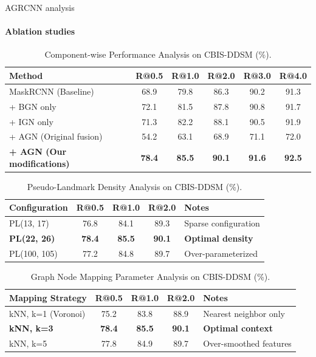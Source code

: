 \documentclass[8pt,aspectratio=169,xcolor=dvipsnames]{beamer}
\begin{document}
\begin{frame}{AGRCNN analysis}
\framesubtitle{Ablation studies}

\begin{table}[t]
   \caption{Component-wise Performance Analysis on CBIS-DDSM (\%).}
   \centering
   \footnotesize
   \renewcommand{\arraystretch}{1.1}
   \begin{tabular}{l|ccccc}
   	\hline
   	\textbf{Method} & \textbf{R@0.5} & \textbf{R@1.0} & \textbf{R@2.0} & \textbf{R@3.0} & \textbf{R@4.0} \\
   	\hline
   	MaskRCNN (Baseline) & 68.9 & 79.8 & 86.3 & 90.2 & 91.3\\
   	+ BGN only & 72.1 & 81.5 & 87.8 & 90.8 & 91.7\\
   	+ IGN only & 71.3 & 82.2 & 88.1 & 90.5 & 91.9\\
   	+ AGN (Original fusion) & 54.2 & 63.1 & 68.9 & 71.1 & 72.0\\
   	\hline
   	\textbf{+ AGN (Our modifications)} & \textbf{78.4} & \textbf{85.5} & \textbf{90.1} & \textbf{91.6} & \textbf{92.5}\\
   	\hline
   \end{tabular}
\end{table}

\begin{table}[t]
   \caption{Pseudo-Landmark Density Analysis on CBIS-DDSM (\%).}
   \centering
   \footnotesize
   \renewcommand{\arraystretch}{1.1}
   \begin{tabular}{l|ccc|l}
   	\hline
   	\textbf{Configuration} & \textbf{R@0.5} & \textbf{R@1.0} & \textbf{R@2.0} & \textbf{Notes} \\
   	\hline
   	PL(13, 17) & 76.8 & 84.1 & 89.3 & Sparse configuration\\
   	\textbf{PL(22, 26)} & \textbf{78.4} & \textbf{85.5} & \textbf{90.1} & \textbf{Optimal density}\\
   	PL(100, 105) & 77.2 & 84.8 & 89.7 & Over-parameterized\\
   	\hline
   \end{tabular}
\end{table}

\begin{table}[t]
   \caption{Graph Node Mapping Parameter Analysis on CBIS-DDSM (\%).}
   \centering
   \footnotesize
   \renewcommand{\arraystretch}{1.1}
   \begin{tabular}{l|ccc|l}
   	\hline
   	\textbf{Mapping Strategy} & \textbf{R@0.5} & \textbf{R@1.0} & \textbf{R@2.0} & \textbf{Notes} \\
   	\hline
   	kNN, k=1 (Voronoi) & 75.2 & 83.8 & 88.9 & Nearest neighbor only\\
   	\textbf{kNN, k=3} & \textbf{78.4} & \textbf{85.5} & \textbf{90.1} & \textbf{Optimal context}\\
   	kNN, k=5 & 77.8 & 84.9 & 89.7 & Over-smoothed features\\
   	\hline
   \end{tabular}
\end{table}
\end{frame}
\end{document}
